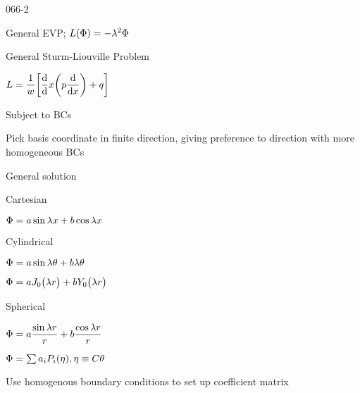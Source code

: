 \begin{mitframe}{066-2}
 \begin{listone}
	\item General EVP; $\length(\pot)=-\wavel^2\pot$
    \begin{listtwo}
    	\item General Sturm-Liouville Problem
        	\begin{listthree}
           		\item $\length=\dfrac{1}{w}\bigg[\dfrac{\mathrm{d}}{\mathrm{d}}\disp\bigg(p\dfrac{\mathrm{d}}{\mathrm{d}\disp}\bigg)+\heatflux\bigg]$ 
            \end{listthree}
    	\end{listtwo}  
    \item Subject to BCs
    \item Pick basis coordinate in finite direction, giving preference to direction with more homogeneous BCs
    \item General solution 
    	\begin{listtwo}
        	\item Cartesian
            	\begin{listthree}
                	\item $\pot=\activity\sin\wavel\disp+b\cos\wavel\disp$
                \end{listthree}
            \item Cylindrical
            		\begin{listthree}
            	\item $\pot=\activity\sin\wavel\theta+b\wavel\theta$
                \item $\pot=\activity{J_{\init}}\big(\wavel\pos\big)+bY_{\init}\big(\wavel\pos\big)$
            		\end{listthree}
            \item Spherical
            	\begin{listthree}
                	\item $\pot=\activity\dfrac{\sin\wavel\pos}{\pos}+b\dfrac{\cos\wavel\pos}{\pos}$
                    \item $\pot=\sum\activity_{\state}\p_{\state}(\intrinsvisc), \intrinsvisc\equiv\conc\theta$
                \end{listthree}
        \end{listtwo}
    \item Use homogenous boundary conditions to set up coefficient matrix

\end{listone}
\end{mitframe}

